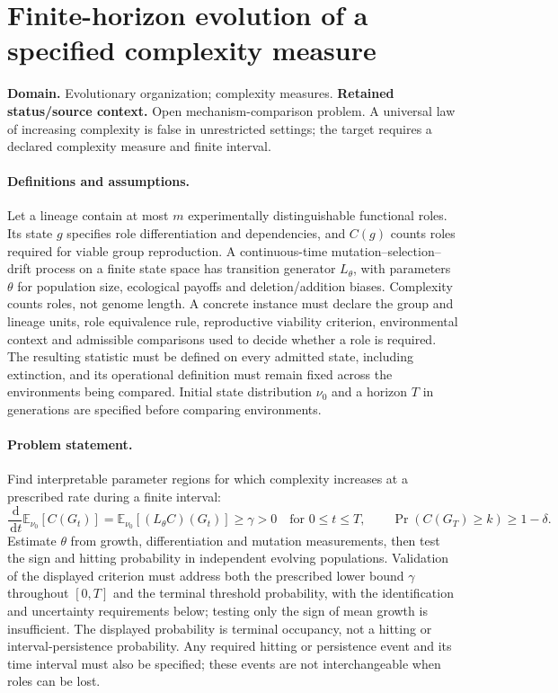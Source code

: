 \documentclass[11pt]{article}
\begin{document}
\section*{Finite-horizon evolution of a specified complexity measure}
\label{prob:157}
\label{rank:236}
\par\smallskip

\noindent\textbf{Domain.} Evolutionary organization; complexity measures. \quad \textbf{Retained status/source context.} Open mechanism-comparison problem. A universal law of increasing complexity is false in unrestricted settings; the target requires a declared complexity measure and finite interval.
\paragraph{Definitions and assumptions.} Let a lineage contain at most $m$ experimentally distinguishable functional roles. Its state $g$ specifies role differentiation and dependencies, and $C(g)$ counts roles required for viable group reproduction. A continuous-time mutation--selection--drift process on a finite state space has transition generator $L_\theta$, with parameters $\theta$ for population size, ecological payoffs and deletion/addition biases. Complexity counts roles, not genome length. A concrete instance must declare the group and lineage units, role equivalence rule, reproductive viability criterion, environmental context and admissible comparisons used to decide whether a role is required. The resulting statistic must be defined on every admitted state, including extinction, and its operational definition must remain fixed across the environments being compared. Initial state distribution $\nu_0$ and a horizon $T$ in generations are specified before comparing environments.
\paragraph{Problem statement.} Find interpretable parameter regions for which complexity increases at a prescribed rate during a finite interval:
\[
 \frac{\,\mathrm{d}}{\,\mathrm{d} t}\mathbb{E}_{\nu_0}[C(G_t)]
 =\mathbb{E}_{\nu_0}[(L_\theta C)(G_t)]\ge\gamma>0
 \quad\text{for }0\le t\le T,
 \qquad \Pr(C(G_T)\ge k)\ge1-\delta.
\]
Estimate $\theta$ from growth, differentiation and mutation measurements, then test the sign and hitting probability in independent evolving populations. Validation of the displayed criterion must address both the prescribed lower bound $\gamma$ throughout $[0,T]$ and the terminal threshold probability, with the identification and uncertainty requirements below; testing only the sign of mean growth is insufficient. The displayed probability is terminal occupancy, not a hitting or interval-persistence probability. Any required hitting or persistence event and its time interval must also be specified; these events are not interchangeable when roles can be lost.
\end{document}
